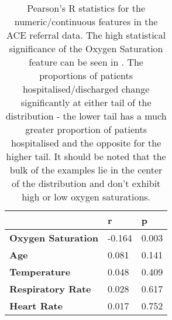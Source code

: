 \begin{table}[H]
    \scriptsize
    \centering
    \renewcommand{\arraystretch}{1.1}
    \caption[Pearson's R statistics for the numeric/continuous features in the ACE referral data]{Pearson's R statistics for the numeric/continuous features in the ACE referral data. The high statistical significance of the Oxygen Saturation feature can be seen in . The proportions of patients hospitalised/discharged change significantly at either tail of the distribution - the lower tail has a much greater proportion of patients hospitalised and the opposite for the higher tail. It should be noted that the bulk of the examples lie in the center of the distribution and don't exhibit high or low oxygen saturations.}
    \label{tab:pearsons-stats}
    \begin{tabular}{lll}
        \toprule
                             & \textbf{r} & \textbf{p} \\\toprule
        \textbf{Oxygen Saturation}      & -0.164     & 0.003      \\
        \textbf{Age}         & 0.081      & 0.141      \\
        \textbf{Temperature}        & 0.048      & 0.409      \\
        \textbf{Respiratory Rate}   & 0.028      & 0.617      \\
        \textbf{Heart Rate}  & 0.017      & 0.752\\\toprule
    \end{tabular}
\end{table}

